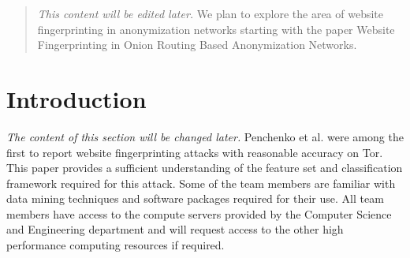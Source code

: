 \documentclass{sig-alternate-05-2015}
\begin{document}
\author{
\alignauthor
Vaibhav Sharma\\%
\alignauthor
Taejoon Byun\\
\and  %
\alignauthor Se Eun Oh\\%
\alignauthor
Elaheh Ghassabani\\
}

\maketitle
\begin{abstract}
\emph{This content will be edited later.} We plan to explore the area of website fingerprinting in anonymization networks starting with the paper Website Fingerprinting in Onion Routing Based Anonymization Networks.
\end{abstract}



\section{Introduction}
\emph{The content of this section will be changed later.} Penchenko et al. \cite{panchenko11:LaTeX} were among the first to report website fingerprinting attacks with reasonable accuracy on Tor. This paper provides a sufficient understanding of the feature set and classification framework required for this attack. Some of the team members are familiar with data mining techniques and software packages required for their use. All team members have access to the compute servers provided by the Computer Science and Engineering department and will request access to the other high performance computing resources if required.
\end{document}
